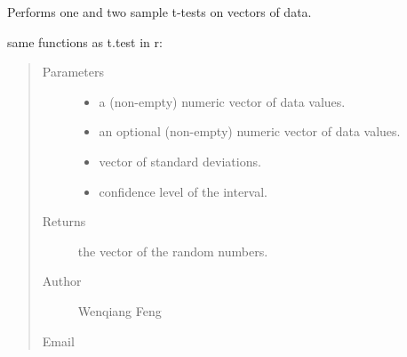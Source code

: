 \documentclass[letterpaper,12pt,english]{sphinxmanual}
\begin{document}
\begin{fulllineitems}
\label{\detokenize{api:statspy.tests.t_test}}
Performs one and two sample t-tests on vectors of data.

same functions as t.test in r: 

\begin{quote}



\end{quote}
\begin{quote}\begin{description}
\item[{Parameters}] \leavevmode\begin{itemize}
\item {} 
 \textendash{} a (non-empty) numeric vector of data values.

\item {} 
 \textendash{} an optional (non-empty) numeric vector of data values.

\item {} 
 \textendash{} vector of standard deviations.

\item {} 
 \textendash{} confidence level of the interval.

\end{itemize}

\item[{Returns}] \leavevmode
the vector of the random numbers.

\item[{Author}] \leavevmode
Wenqiang Feng

\item[{Email}] \leavevmode
{}

\end{description}\end{quote}

\end{fulllineitems}
\end{document}
